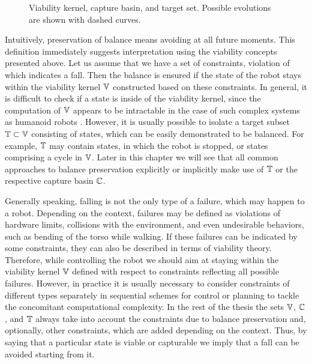 %
\begin{figure}[ht]
    \caption[Viability kernel, capture basin, and target set.]{
        Viability kernel, capture basin, and target set. Possible evolutions
        are shown with dashed curves.
    }
    \label{fig.viability}
\end{figure}
%


Intuitively, preservation of balance means avoiding  at all future
moments. This definition immediately suggests interpretation using the
viability concepts presented above. Let us assume that we have a set of
constraints, violation of which indicates a fall. Then the balance is ensured
if the state of the robot stays within the viability kernel $\mathbb{V}$
constructed based on these constraints. In general, it is difficult to check if
a state is inside of the viability kernel, since the computation of $\mathbb{V}$
appears to be intractable in the case of such complex systems as humanoid
robots \cite{Wieber2002stability}. However, it is usually possible to isolate a
target subset $\mathbb{T} \subset \mathbb{V}$ consisting of states, which can be
easily demonstrated to be balanced. For example, $\mathbb{T}$ may contain states,
in which the robot is stopped, or states comprising a cycle in $\mathbb{V}$. Later
in this chapter we will see that all common approaches to balance preservation
explicitly or implicitly make use of $\mathbb{T}$ or the respective capture basin
$\mathbb{C}$.


Generally speaking, falling is not the only type of a failure, which may happen
to a robot. Depending on the context, failures may be defined as violations of
hardware limits, collisions with the environment, and even undesirable
behaviors, such as bending of the torso while walking. If these failures can
be indicated by some constraints, they can also be described in terms of
viability theory. Therefore, while controlling the robot we should aim at
staying within the viability kernel $\mathbb{V}$ defined with respect to
constraints reflecting all possible failures. However, in practice it is
usually necessary to consider constraints of different types separately in
sequential schemes for control or planning to tackle the concomitant
computational complexity. In the rest of the thesis the sets $\mathbb{V}$,
$\mathbb{C}$, and $\mathbb{T}$ always take into account the constraints due to
balance preservation and, optionally, other constraints, which are added
depending on the context. Thus, by saying that a particular state is viable or
capturable we imply that a fall can be avoided starting from it.


